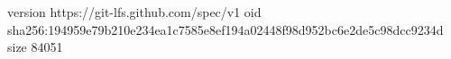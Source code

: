 version https://git-lfs.github.com/spec/v1
oid sha256:194959e79b210e234ea1c7585e8ef194a02448f98d952bc6e2de5c98dcc9234d
size 84051
